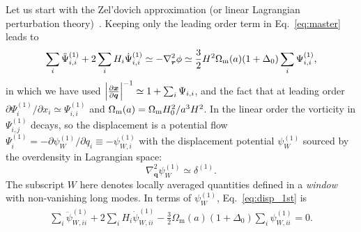 \documentclass[a4paper,11pt]{article}
\newcommand{\vr}{{\bm r}}
\newcommand{\vx}{{\bm x}}
\newcommand{\vq}{{\bm q}}
\begin{document}
Let us start with the Zel'dovich approximation (or linear Lagrangian
perturbation theory)~\cite{Zeldovich:1969}.
Keeping only the leading order term in Eq.~\eqref{eq:master} leads to 
\begin{equation}
    \sum_i\ddot \Psi_{i,i}^{(1)} + 2 \sum_i H_i \dot \Psi_{i,i}^{(1)} \simeq - \nabla_{\vr}^2 \phi
    \simeq \frac{3}{2}H^2 \Omega_{\rm m}(a)  (1 + \Delta_0)\sum_i\Psi_{i,i}^{(1)},
    \label{eq:disp_1st}
\end{equation}
in which we have used $\Bigl| \frac{\partial{\vx}}{\partial{\vq}} \Bigr|^{-1} \simeq 1 + \sum_i\Psi_{i,i}$,
 and the fact that at leading order $\partial\Psi_i^{(1)} / \partial x_i \simeq \Psi_{i,i}^{(1)}$
and $\Omega_{\rm m}(a) =  \Omega_{\rm m}H_0^2/a^3H^2$.
In the linear order the vorticity in $\Psi_{i,j}^{(1)}$ decays, so the displacement
is a potential flow $\Psi_i^{(1)} = - \partial\psi_W^{(1)}/ \partial q_i \equiv -\psi_{W,i}^{(1)}$
with the displacement potential $\psi_W^{(1)}$ sourced by the overdensity in Lagrangian
space:
\begin{equation}
    \nabla_{\vq}^2 \psi_W^{(1)} \simeq \delta^{(1)}.
\end{equation}
The subscript $W$ here
denotes locally averaged quantities
defined in a \emph{window} with non-vanishing long modes.
In terms of $\psi_W^{(1)}$, Eq.~\eqref{eq:disp_1st} is 
\begin{align}
  \sum_i \ddot \psi^{(1)}_{W,ii} + 2\sum_i H_i  \dot\psi^{(1)}_{W,ii}
   - \frac32  \Omega_\mathrm{m}(a) (1 + \Delta_0)\sum_i \psi^{(1)}_{W,ii} = 0.
   \label{eq:psiW_1st}
\end{align}
\end{document}

